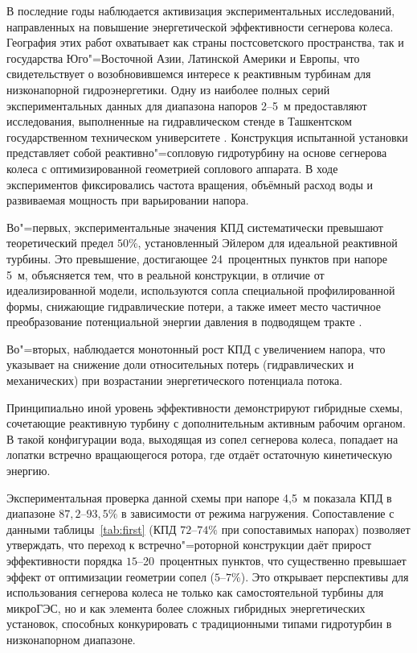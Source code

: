 В последние годы наблюдается активизация экспериментальных исследований,
направленных на повышение энергетической эффективности сегнерова колеса. География
этих работ охватывает как страны постсоветского пространства, так и государства Юго"=Восточной Азии, Латинской Америки и Европы, что свидетельствует о возобновившемся
интересе к реактивным турбинам для низконапорной гидроэнергетики. Одну из наиболее 
полных серий экспериментальных данных для диапазона напоров 2--5~м предоставляют 
исследования, выполненные на гидравлическом стенде в Ташкентском государственном 
техническом университете \cite{bozarov2023,bozarov2024a, bozarov2024b}. Конструкция испытанной установки представляет собой 
реактивно"=сопловую гидротурбину на основе сегнерова колеса с оптимизированной 
геометрией соплового аппарата. В ходе экспериментов фиксировались частота вращения, 
объёмный расход воды и развиваемая мощность при варьировании напора.

Во"=первых, экспериментальные значения КПД систематически превышают
теоретический предел $50\%$, установленный Эйлером для идеальной реактивной турбины.
Это превышение, достигающее 24~процентных пунктов при напоре 5~м, объясняется тем, 
что в реальной конструкции, в отличие от идеализированной модели, используются сопла
специальной профилированной формы, снижающие гидравлические потери, а также имеет
место частичное преобразование потенциальной энергии давления в подводящем тракте \cite{bozarov2024a}.

Во"=вторых, наблюдается монотонный рост КПД с увеличением напора, что указывает
на снижение доли относительных потерь (гидравлических и механических) при 
возрастании энергетического потенциала потока.

Принципиально иной уровень эффективности демонстрируют гибридные схемы,
сочетающие реактивную турбину с дополнительным активным рабочим органом. В такой
конфигурации вода, выходящая из сопел сегнерова колеса, попадает на лопатки встречно
вращающегося ротора, где отдаёт остаточную кинетическую энергию.

Экспериментальная проверка данной схемы \cite{bozarov2024b} при напоре 4,5~м показала КПД в
диапазоне $87{,}2$--$93{,}5\%$ в зависимости от режима нагружения. Сопоставление с данными
таблицы~\ref{tab:first} (КПД $72$--$74\%$ при сопоставимых напорах) позволяет утверждать, 
что переход к встречно"=роторной конструкции даёт прирост эффективности порядка 
$15$--20~процентных пунктов, что существенно превышает эффект от оптимизации геометрии 
сопел ($5$--$7\%$). Это открывает перспективы для использования сегнерова колеса не 
только как самостоятельной турбины для микроГЭС, но и как элемента более сложных 
гибридных энергетических установок, способных конкурировать с традиционными типами 
гидротурбин в низконапорном диапазоне.

